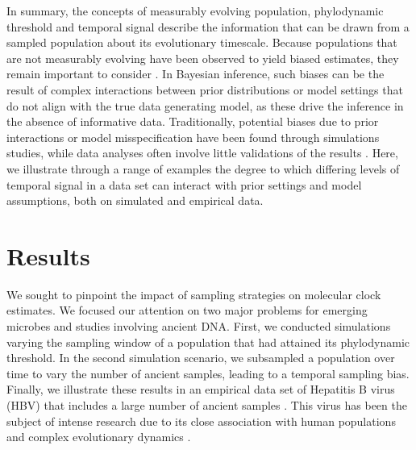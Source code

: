 \documentclass[11pt]{article}
\begin{document}
In summary, the concepts of measurably evolving population, phylodynamic threshold and temporal signal describe the information that can be drawn from a sampled population about its evolutionary timescale. Because populations that are not measurably evolving have been observed to yield biased estimates, they remain important to consider \citep{gharbi2024clock}. In Bayesian inference, such biases can be the result of complex interactions between prior distributions or model settings that do not align with the true data generating model, as these drive the inference in the absence of informative data. Traditionally, potential biases due to prior interactions \citep{tay2024assessing} or model misspecification \citep{moller2018impact} have been found through simulations studies, while data analyses often involve little validations of the results \citep{mendes2025validate}. Here, we illustrate through a range of examples the degree to which differing levels of temporal signal in a data set can interact with prior settings and model assumptions, both on simulated and empirical data. 
\section{Results}
We sought to pinpoint the impact of sampling strategies on molecular clock estimates. We focused our attention on two major problems for emerging microbes and studies involving ancient DNA. First, we conducted simulations varying the sampling window of a population that had attained its phylodynamic threshold. In the second simulation scenario, we subsampled a population over time to vary the number of ancient samples, leading to a temporal sampling bias. Finally, we illustrate these results in an empirical data set of Hepatitis B virus (HBV) that includes a large number of ancient samples \citep{kocher2021ten}. This virus has been the subject of intense research due to its close association with human populations and complex evolutionary dynamics \citep{paraskevis2013dating, ross2018paradox, kahila2012tracing}.
\end{document}
